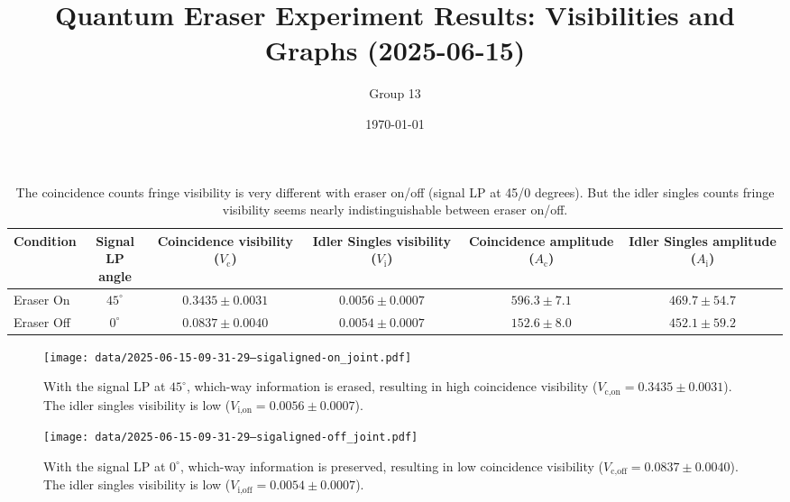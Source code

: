 \documentclass{article}
\title{Quantum Eraser Experiment Results: Visibilities and Graphs (2025-06-15)}
\author{Group 13} %
\date{\today}
\begin{document}
\pagestyle{empty} %

\begin{table}[h!]
\centering
\begin{tabular}{lccccc}
\toprule
Condition & \makecell{Signal \\ LP angle} & \makecell{Coincidence \\ visibility ($V_{\text{c}}$)} & \makecell{Idler Singles \\ visibility ($V_{\text{i}}$)} & \makecell{Coincidence \\ amplitude ($A_{\text{c}}$)} & \makecell{Idler Singles \\ amplitude ($A_{\text{i}}$)} \\
\midrule
Eraser On   & $45^\circ$ & $0.3435 \pm 0.0031$ & $0.0056 \pm 0.0007$ & $596.3 \pm 7.1$ & $469.7 \pm 54.7$ \\
Eraser Off  & $0^\circ$  & $0.0837 \pm 0.0040$ & $0.0054 \pm 0.0007$ & $152.6 \pm 8.0$ & $452.1 \pm 59.2$ \\
\bottomrule
\end{tabular}
\caption*{
  The coincidence counts fringe visibility is very different with eraser on/off (signal LP at 45/0 degrees).
  But the idler singles counts fringe visibility seems nearly indistinguishable between eraser on/off.
}
\end{table}

\begin{figure}[h!]
\centering
\texttt{[image: data/2025-06-15-09-31-29--sigaligned-on\_joint.pdf]}
\caption*{
  With the signal LP at $45^\circ$, which-way information is erased, resulting in high coincidence visibility ($V_{\text{c,on}}=0.3435 \pm 0.0031$). The idler singles visibility is low ($V_{\text{i,on}}=0.0056 \pm 0.0007$).
}
\end{figure}

\begin{figure}[h!]
\centering
\texttt{[image: data/2025-06-15-09-31-29--sigaligned-off\_joint.pdf]}
\caption*{
  With the signal LP at $0^\circ$, which-way information is preserved, resulting in low coincidence visibility ($V_{\text{c,off}}=0.0837 \pm 0.0040$). The idler singles visibility is low ($V_{\text{i,off}}=0.0054 \pm 0.0007$).
}
\end{figure}
\end{document}
